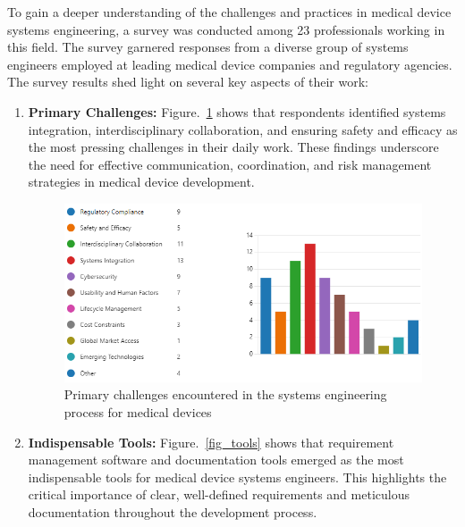 \documentclass[conference]{IEEEtran}
\begin{document}

    To gain a deeper understanding of the challenges and practices 
    in medical device systems engineering, a survey was conducted 
    among 23 professionals working in this field. The survey 
    garnered responses from a diverse group of systems engineers 
    employed at leading medical device companies and regulatory 
    agencies. The survey results shed light on several key aspects 
    of their work:%

    \begin{enumerate}

        \item \textbf{Primary Challenges:} Figure.~\ref{fig_challenges} 
        shows that respondents identified systems 
        integration, interdisciplinary collaboration, and ensuring safety 
        and efficacy as the most pressing challenges in their daily work. 
        These findings underscore the need for effective communication, 
        coordination, and risk management strategies in medical device 
        development.

        \begin{figure}[htbp]
            \centerline{\includegraphics[width=\linewidth]{../report/_book/images/paste-31.png}}
            \caption{Primary challenges encountered in the systems engineering 
            process for medical devices}
            \label{fig_challenges}
        \end{figure}
            
        \item \textbf{Indispensable Tools:} Figure.~\ref{fig_tools} shows that
        requirement management software and documentation tools emerged as the most indispensable tools 
        for medical device systems engineers. This highlights the critical 
        importance of clear, well-defined requirements and meticulous 
        documentation throughout the development process.


\end{enumerate}
\end{document}
